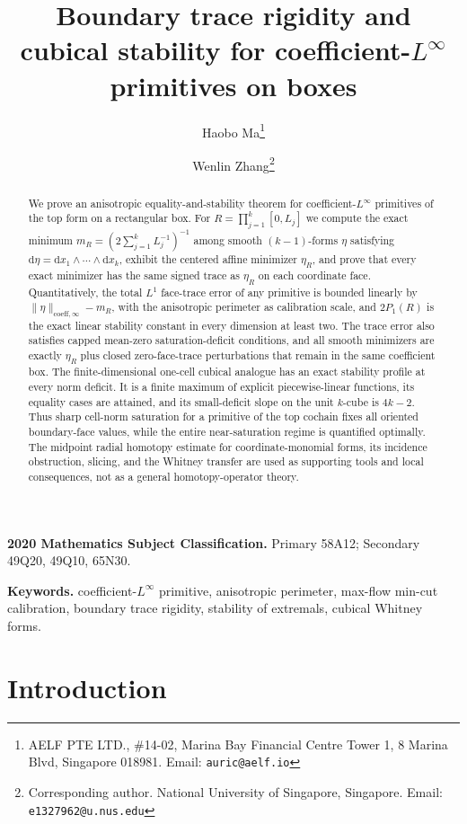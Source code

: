 \documentclass[11pt,letterpaper]{article}
\title{Boundary trace rigidity and cubical stability for coefficient-$L^\infty$ primitives on boxes}
\author{
  Haobo Ma\thanks{AELF PTE LTD., \#14-02, Marina Bay Financial Centre Tower 1, 8 Marina Blvd, Singapore 018981. Email: \texttt{auric@aelf.io}}
  \and
  Wenlin Zhang\thanks{Corresponding author. National University of Singapore, Singapore. Email: \texttt{e1327962@u.nus.edu}}
}
\date{}
\numberwithin{equation}{section}
\theoremstyle{plain}
\theoremstyle{definition}
\theoremstyle{remark}
\newcommand{\dd}{\mathrm{d}}
\newcommand{\norm}[1]{\lVert #1 \rVert}
\newcommand{\coeff}{\mathrm{coeff}}
\begin{document}
\maketitle

\begin{abstract}
We prove an anisotropic equality-and-stability theorem for
coefficient-$L^\infty$ primitives of the top form on a rectangular box.  For
$R=\prod_{j=1}^k[0,L_j]$ we compute the exact minimum
$m_R=(2\sum_{j=1}^kL_j^{-1})^{-1}$ among smooth $(k-1)$-forms $\eta$ satisfying
$\dd\eta=\dd x_1\wedge\cdots\wedge\dd x_k$, exhibit the centered affine
minimizer $\eta_R$, and prove that every exact minimizer has the same signed
trace as $\eta_R$ on each coordinate face.  Quantitatively, the total $L^1$
face-trace error of any primitive is bounded linearly by
$\norm{\eta}_{\coeff,\infty}-m_R$, with the anisotropic perimeter as calibration
scale, and $2P_1(R)$ is the exact linear stability constant in every dimension
at least two.  The trace error also satisfies capped mean-zero saturation-deficit
conditions, and all smooth minimizers are exactly $\eta_R$ plus closed
zero-face-trace perturbations that remain in the same coefficient box.  The
finite-dimensional one-cell cubical analogue has an exact stability profile at
every norm deficit.  It is a finite maximum of explicit piecewise-linear
functions, its equality cases are attained, and its small-deficit slope on the
unit $k$-cube is $4k-2$.  Thus sharp cell-norm saturation for a primitive of
the top cochain fixes all oriented boundary-face values, while the entire
near-saturation regime is quantified optimally.  The midpoint radial homotopy estimate for
coordinate-monomial forms, its incidence obstruction, slicing, and the Whitney
transfer are used as supporting tools and local consequences, not as a general
homotopy-operator theory.
\end{abstract}

\bigskip
\noindent\textbf{2020 Mathematics Subject Classification.} Primary 58A12; Secondary 49Q20, 49Q10, 65N30.

\noindent\textbf{Keywords.} coefficient-$L^\infty$ primitive, anisotropic
perimeter, max-flow min-cut calibration, boundary trace rigidity, stability of
extremals, cubical Whitney forms.

\section{Introduction}
\end{document}
